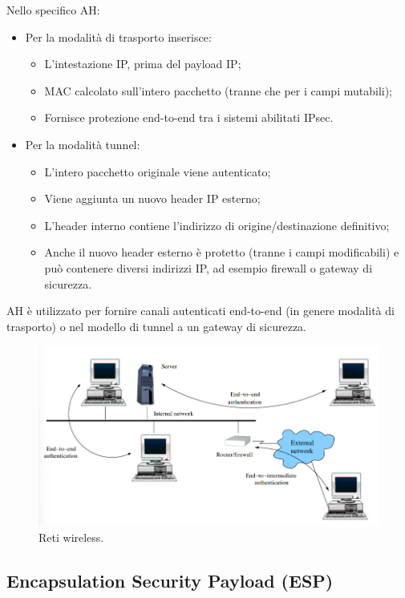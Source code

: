 Nello specifico AH:
\begin{itemize}
    \item Per la modalità di trasporto inserisce:
	\begin{itemize}
	    \item L'intestazione IP, prima del payload IP;
		\item MAC calcolato sull'intero pacchetto (tranne che per i campi mutabili);
		\item  Fornisce protezione end-to-end tra i sistemi abilitati IPsec. 
	\end{itemize}
	\item Per la modalità tunnel:
	\begin{itemize}
	    \item L'intero pacchetto originale viene autenticato;
		\item Viene aggiunta un nuovo header IP esterno;
		\item L'header interno contiene l'indirizzo di origine/destinazione definitivo;
		\item Anche il nuovo header esterno è protetto (tranne i campi modificabili) e può contenere diversi indirizzi IP, ad esempio firewall o gateway di sicurezza.
	\end{itemize}
\end{itemize}

AH è utilizzato per fornire canali autenticati end-to-end (in genere modalità di trasporto) o nel modello di tunnel a un gateway di sicurezza.

\begin{figure}[h]
    \centering
    \includegraphics[width=1\textwidth]{images/chapter9/9-7.png}
    \caption{Reti wireless.}
    \label{fig:9-7}
\end{figure}

\subsection{Encapsulation Security Payload (ESP)}

